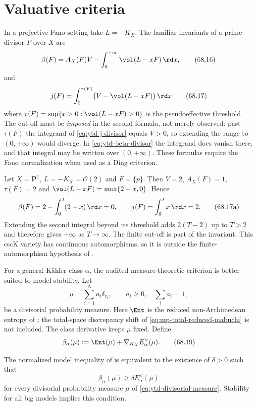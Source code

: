 \section{Valuative criteria}
\label{sec:ytd-valuative}

In a projective Fano setting take $L=-K_X$. The familiar invariants of a prime
divisor $F$ over $X$ are
\[
 \beta(F)
  =A_X(F)V-\int_0^{+\infty}\vol(L-xF)\,\rd x,
\tag{68.16}\label{eq:ytd-beta-divisor}
\]
and
\[
  j(F)
  =\int_0^{\tau(F)}
       \bigl(V-\vol(L-xF)\bigr)\,\rd x
\tag{68.17}\label{eq:ytd-j-divisor}
\]
where $\tau(F)=\sup\{x>0:\vol(L-xF)>0\}$ is the pseudoeffective
threshold.  The cut-off must be \emph{imposed} in the second formula, not
merely observed: past $\tau(F)$ the integrand of
\eqref{eq:ytd-j-divisor} equals $V>0$, so extending the range to
$(0,+\infty)$ would diverge.  In \eqref{eq:ytd-beta-divisor} the integrand
does vanish there, and that integral may be written over
$(0,+\infty)$. These formulas require the Fano normalization when used as
a Ding criterion.

\begin{example}
\label{ex:ytd-fano-point}
Let $X=\mathbf P^1$, $L=-K_X=\mathcal O(2)$ and $F=\{p\}$.
Then $V=2$, $A_X(F)=1$, $\tau(F)=2$ and
$\vol(L-xF)=\max\{2-x,0\}$. Hence
\[
 \beta(F)=2-\int_0^2(2-x)\,\rd x=0,
 \qquad j(F)=\int_0^2 x\,\rd x=2.
\tag{68.17a}\label{eq:ytd-fano-point-invariants}
\]
Extending the second integral beyond its threshold adds $2(T-2)$ up to
$T>2$ and therefore gives $+\infty$ as $T\to\infty$. The finite cut-off
is part of the invariant. This cscK variety has continuous automorphisms,
so it is outside the finite-automorphism hypothesis of
.
\end{example}

For a general K\"ahler class $\alpha$, the audited
measure-theoretic criterion is better suited to model stability.
Let
\[
                \mu=\sum_{i=1}^Na_i\delta_{v_i},
       \qquad a_i\geq0,\quad\sum_i a_i=1,
\tag{68.18}\label{eq:ytd-divisorial-measure}
\]
be a divisorial probability measure. Here $\Ent$ is the reduced
non-Archimedean entropy of ; the total-space
discrepancy shift of \eqref{eq:mp-total-reduced-mabuchi} is not included.
The class derivative keeps $\mu$ fixed. Define
\[
             \beta_\alpha(\mu)
            :=\Ent(\mu)+\nabla_{K_X}E_\alpha^\vee(\mu).
\tag{68.19}\label{eq:ytd-beta-measure}
\]

\begin{theorem}\label{thm:ytd-valuative-measures}
The normalized model inequality of
 is equivalent to the existence of
$\delta>0$ such that
\[
            \beta_\alpha(\mu)
               \geq\delta E_\alpha^\vee(\mu)
\tag{68.20}\label{eq:ytd-valuative-criterion}
\]
for every divisorial probability measure $\mu$ of
\eqref{eq:ytd-divisorial-measure}.
Stability for all big models implies this condition.
\end{theorem}

